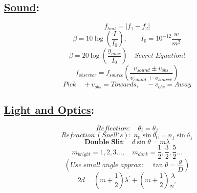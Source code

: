 \documentclass[fleqn]{article}
\begin{document}
\begin{multicols*}{3}
\subsection*{ \centering \underline{Sound}: }
\[ f_{beat} = |f_1-f_2| \]
\[ \beta = 10\log{\left(\frac{I}{I_0}\right)}, \qquad I_0 = 10^{-12} \frac{w}{m^2} \]
\[ \boxed{\beta = 20\log{\left(\frac{y_{max}}{I_0}\right)}} \quad Secret \; Equation! \]
\[ f_{observer} = f_{source}\left(\frac{v_{sound}\pm v_{obs}}{v_{sound}\mp v_{source}}\right) \]
\[ Pick \quad +v_{obs} = Towards, \quad -v_{obs} = Away \]

\subsection*{ \centering \underline{Light and Optics}: }
\[ Reflection: \quad \theta_i = \theta_f \]
\[ Refraction \, (Snell's): \; n_0\sin{\theta_0} = n_f\sin{\theta_f} \]
\[ \textbf{Double Slit:} \quad d\sin{\theta} = m\lambda \]
\[ m_{bright} = 1, 2, 3..., \quad m_{dark} = \frac{1}{2}, \frac{3}{2}, \frac{5}{2}... \]
\[ (Use \; small \; angle \; approx: \quad \tan{\theta} = \frac{y}{D}) \]
\[ 2d = (m + \frac{1}{2})\lambda^\prime + (m + \frac{1}{2})\frac{\lambda}{n^\prime} \]

\end{multicols*}
\end{document}
